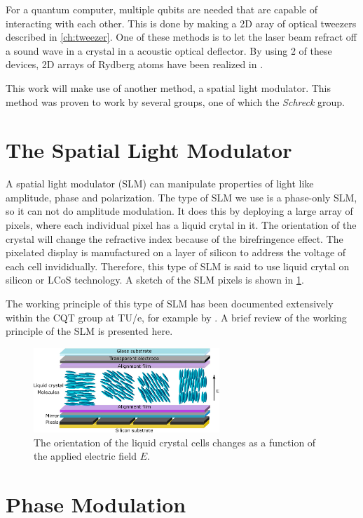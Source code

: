 For a quantum computer, multiple qubits are needed that are capable of interacting with each other. This is done by making a 2D aray of optical tweezers described in \cref{ch:tweezer}. One of these methods is to let the laser beam refract off a sound wave in a crystal in a acoustic optical deflector. By using 2 of these devices, 2D arrays of Rydberg atoms have been realized in \cite{Madjarov2020}.

This work will make use of another method, a spatial light modulator. This method was proven to work by several groups, one of which the \textit{Schreck} group.

\section{The Spatial Light Modulator}

A spatial light modulator (SLM) can manipulate properties of light like amplitude, phase and polarization. The type of SLM we use is a phase-only SLM, so it can not do amplitude modulation. It does this by deploying a large array of pixels, where each individual pixel has a liquid crytal in it. The orientation of the crystal will change the refractive index because of the birefringence effect. The pixelated display is manufactured on a layer of silicon to address the voltage of each cell invididually. Therefore, this type of SLM is said to use liquid crytal on silicon or LCoS technology. A sketch of the SLM pixels is shown in \cref{fig:LCoS}.

The working principle of this type of SLM has been documented extensively within the CQT group at TU/e, for example by \cite{Dijk2012,Bijnen2013}. A brief review of the working principle of the SLM is presented here.

\begin{figure}
    \centering
    \includegraphics[width=7cm]{figures/LCoS.png}
    \caption{The orientation of the liquid crystal cells changes as a function of the applied electric field $E$.}
    \label{fig:LCoS}
\end{figure}

\section{Phase Modulation}

